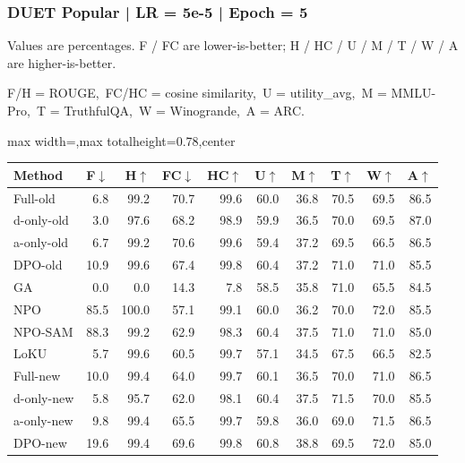 \documentclass[aspectratio=169,11pt]{beamer}
\begin{document}
\begin{frame}[t]
\frametitle{DUET Popular | LR = 5e-5 | Epoch = 5}
{\tiny Values are percentages. F / FC are lower-is-better; H / HC / U / M / T / W / A are higher-is-better.}

{\tiny F/H = ROUGE,\ FC/HC = cosine similarity,\ U = utility\_avg,\ M = MMLU-Pro,\ T = TruthfulQA,\ W = Winogrande,\ A = ARC.}

\vspace{0.35em}
\centering
\scriptsize
\setlength{\tabcolsep}{3.6pt}
\renewcommand{\arraystretch}{1.05}
\begin{adjustbox}{max width=\textwidth,max totalheight=0.78\textheight,center}
\begin{tabular}{l*{9}{r}}
\toprule
Method & F$\downarrow$ & H$\uparrow$ & FC$\downarrow$ & HC$\uparrow$ & U$\uparrow$ & M$\uparrow$ & T$\uparrow$ & W$\uparrow$ & A$\uparrow$ \\
\midrule
\rowcolor{blue!10}
Full-old & 6.8 & 99.2 & 70.7 & 99.6 & 60.0 & 36.8 & 70.5 & 69.5 & 86.5 \\
\rowcolor{orange!10}
d-only-old & 3.0 & 97.6 & 68.2 & 98.9 & 59.9 & 36.5 & 70.0 & 69.5 & 87.0 \\
\rowcolor{green!10}
a-only-old & 6.7 & 99.2 & 70.6 & 99.6 & 59.4 & 37.2 & 69.5 & 66.5 & 86.5 \\
\rowcolor{gray!8}
DPO-old & 10.9 & 99.6 & 67.4 & 99.8 & 60.4 & 37.2 & 71.0 & 71.0 & 85.5 \\
\rowcolor{gray!8}
GA & 0.0 & 0.0 & 14.3 & 7.8 & 58.5 & 35.8 & 71.0 & 65.5 & 84.5 \\
\rowcolor{gray!8}
NPO & 85.5 & 100.0 & 57.1 & 99.1 & 60.0 & 36.2 & 70.0 & 72.0 & 85.5 \\
\rowcolor{gray!8}
NPO-SAM & 88.3 & 99.2 & 62.9 & 98.3 & 60.4 & 37.5 & 71.0 & 71.0 & 85.0 \\
\rowcolor{gray!8}
LoKU & 5.7 & 99.6 & 60.5 & 99.7 & 57.1 & 34.5 & 67.5 & 66.5 & 82.5 \\
\rowcolor{blue!20}
Full-new & 10.0 & 99.4 & 64.0 & 99.7 & 60.1 & 36.5 & 70.0 & 71.0 & 86.5 \\
\rowcolor{orange!20}
d-only-new & 5.8 & 95.7 & 62.0 & 98.1 & 60.4 & 37.5 & 71.5 & 70.0 & 85.5 \\
\rowcolor{green!20}
a-only-new & 9.8 & 99.4 & 65.5 & 99.7 & 59.8 & 36.0 & 69.0 & 71.5 & 86.5 \\
\rowcolor{gray!15}
DPO-new & 19.6 & 99.4 & 69.6 & 99.8 & 60.8 & 38.8 & 69.5 & 72.0 & 85.0 \\
\bottomrule
\end{tabular}
\end{adjustbox}
\end{frame}
\end{document}
